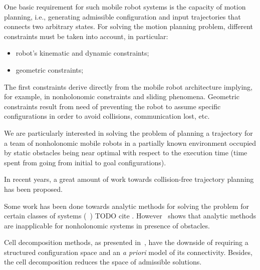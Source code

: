 \documentclass[eprint]{actapoly}
\begin{document}

One basic requirement for such mobile robot systems is the capacity of motion planning, i.e., generating admissible configuration and input trajectories that connects two arbitrary states. For solving the motion planning problem, different 
constraints must be taken into account, in particular:

\begin{itemize}

 \item robot's kinematic and dynamic constraints;

 \item geometric constraints;


\end{itemize}

The first constraints derive directly from the mobile robot architecture 
implying, for example, in nonholonomic constraints and sliding phenomena.
Geometric 
constraints result from need of preventing the robot to assume specific configurations
in order to avoid collisions, communication lost, etc.


We are particularly interested in solving the problem of planning a 
trajectory for a team of nonholonomic mobile robots in a partially known 
environment occupied by static obstacles being near optimal with respect to the 
execution time (time spent from going from initial to goal configurations).



In recent years, a great amount of work towards collision-free trajectory 
planning has been proposed.

Some work has been done towards analytic methods for solving the problem for 
certain classes of systems (~\cite{})
TODO cite
. However~\cite{Schwartz1988} shows 
that analytic methods  are inapplicable for nonholonomic systems in presence of 
obstacles.


Cell decomposition methods, as presented in~\cite{Latombe1991}, have the 
downside of requiring a structured configuration space and an \textit{a priori} 
model of its connectivity. Besides, the cell decomposition reduces the space 
of admissible solutions.
\end{document}

